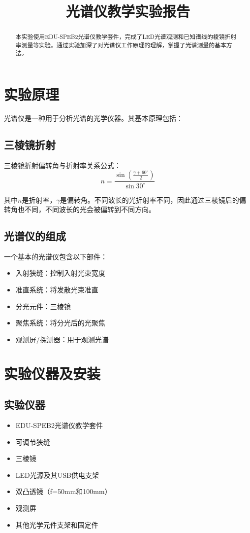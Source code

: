 \documentclass{ctexart}
\title{光谱仪教学实验报告}
\begin{document}
\maketitle

\begin{abstract}
本实验使用EDU-SPEB2光谱仪教学套件，完成了LED光谱观测和已知谱线的棱镜折射率测量等实验。通过实验加深了对光谱仪工作原理的理解，掌握了光谱测量的基本方法。
\end{abstract}

\section{实验原理}

光谱仪是一种用于分析光谱的光学仪器。其基本原理包括：

\subsection{三棱镜折射}
三棱镜折射偏转角与折射率关系公式：
\[n=\frac{\sin\left(\frac{\gamma+60^\circ}{2}\right)}{\sin 30^\circ}\]

其中$n$是折射率，$\gamma$是偏转角。不同波长的光折射率不同，因此通过三棱镜后的偏转角也不同，不同波长的光会被偏转到不同方向。
\subsection{光谱仪的组成}
一个基本的光谱仪包含以下部件：
\begin{itemize}
    \item 入射狭缝：控制入射光束宽度
    \item 准直系统：将发散光束准直
    \item 分光元件：三棱镜
    \item 聚焦系统：将分光后的光聚焦
    \item 观测屏/探测器：用于观测光谱
\end{itemize}

\section{实验仪器及安装}
\subsection{实验仪器}
\begin{itemize}
    \item EDU-SPEB2光谱仪教学套件
    \item 可调节狭缝
    \item 三棱镜
    \item LED光源及其USB供电支架
    \item 双凸透镜（f=50mm和100mm）
    \item 观测屏
    \item 其他光学元件支架和固定件
\end{itemize}
\end{document}
